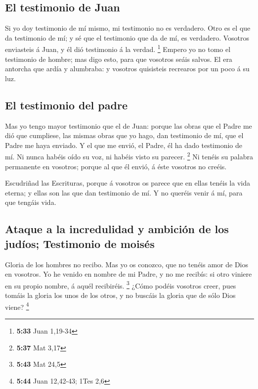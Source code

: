 \hypertarget{el-testimonio-de-juan}{%
\subsection{El testimonio de Juan}\label{el-testimonio-de-juan}}

 Si yo doy testimonio de mí mismo, mi testimonio no es
verdadero.  Otro es el que da testimonio de mí; y sé que el
testimonio que da de mí, es verdadero.  Vosotros enviasteis
á Juan, y él dió testimonio á la verdad. \footnote{\textbf{5:33} Juan
  1,19-34}  Empero yo no tomo el testimonio de hombre; mas
digo esto, para que vosotros seáis salvos.  El era antorcha
que ardía y alumbraba: y vosotros quisisteis recrearos por un poco á su
luz.

\hypertarget{el-testimonio-del-padre}{%
\subsection{El testimonio del padre}\label{el-testimonio-del-padre}}

 Mas yo tengo mayor testimonio que el de Juan: porque las
obras que el Padre me dió que cumpliese, las mismas obras que yo hago,
dan testimonio de mí, que el Padre me haya enviado.  Y el
que me envió, el Padre, él ha dado testimonio de mí. Ni nunca habéis
oído su voz, ni habéis visto su parecer. \footnote{\textbf{5:37} Mat
  3,17}  Ni tenéis su palabra permanente en vosotros;
porque al que él envió, á éste vosotros no creéis.

 Escudriñad las Escrituras, porque á vosotros os parece que
en ellas tenéis la vida eterna; y ellas son las que dan testimonio de
mí.  Y no queréis venir á mí, para que tengáis vida.

\hypertarget{ataque-a-la-incredulidad-y-ambiciuxf3n-de-los-juduxedos-testimonio-de-moisuxe9s}{%
\subsection{Ataque a la incredulidad y ambición de los judíos;
Testimonio de
moisés}\label{ataque-a-la-incredulidad-y-ambiciuxf3n-de-los-juduxedos-testimonio-de-moisuxe9s}}

 Gloria de los hombres no recibo.  Mas yo os
conozco, que no tenéis amor de Dios en vosotros.  Yo he
venido en nombre de mi Padre, y no me recibís: si otro viniere en su
propio nombre, á aquél recibiréis. \footnote{\textbf{5:43} Mat 24,5}
 ¿Cómo podéis vosotros creer, pues tomáis la gloria los
unos de los otros, y no buscáis la gloria que de sólo Dios viene?
\footnote{\textbf{5:44} Juan 12,42-43; 1Tes 2,6}

